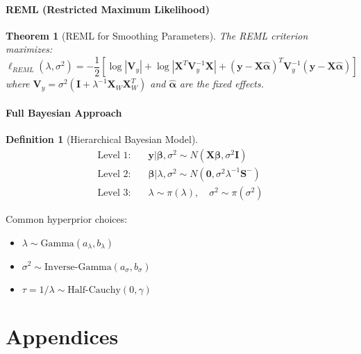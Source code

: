 \documentclass[12pt]{article}
\newtheorem{theorem}{Theorem}
\newtheorem{definition}{Definition}
\begin{document}
\subsection{REML (Restricted Maximum Likelihood)}

\begin{theorem}[REML for Smoothing Parameters]
The REML criterion maximizes:
\begin{equation}
\ell_{REML}(\lambda, \sigma^2) = -\frac{1}{2}\left[\log|\mathbf{V}_y| + \log|\mathbf{X}^T\mathbf{V}_y^{-1}\mathbf{X}| + (\mathbf{y} - \mathbf{X}\hat{\bm{\alpha}})^T\mathbf{V}_y^{-1}(\mathbf{y} - \mathbf{X}\hat{\bm{\alpha}})\right]
\end{equation}
where $\mathbf{V}_y = \sigma^2(\mathbf{I} + \lambda^{-1}\mathbf{X}_W\mathbf{X}_W^T)$ and $\hat{\bm{\alpha}}$ are the fixed effects.
\end{theorem}

\subsection{Full Bayesian Approach}

\begin{definition}[Hierarchical Bayesian Model]
\begin{align}
\text{Level 1:} \quad & \mathbf{y} | \bm{\beta}, \sigma^2 \sim N(\mathbf{X}\bm{\beta}, \sigma^2\mathbf{I}) \\
\text{Level 2:} \quad & \bm{\beta} | \lambda, \sigma^2 \sim N(\mathbf{0}, \sigma^2\lambda^{-1}\mathbf{S}^{-}) \\
\text{Level 3:} \quad & \lambda \sim \pi(\lambda), \quad \sigma^2 \sim \pi(\sigma^2)
\end{align}
\end{definition}

Common hyperprior choices:
\begin{itemize}
    \item $\lambda \sim \text{Gamma}(a_\lambda, b_\lambda)$
    \item $\sigma^2 \sim \text{Inverse-Gamma}(a_\sigma, b_\sigma)$
    \item $\tau = 1/\lambda \sim \text{Half-Cauchy}(0, \gamma)$
\end{itemize}

\part{Appendices}
\end{document}
